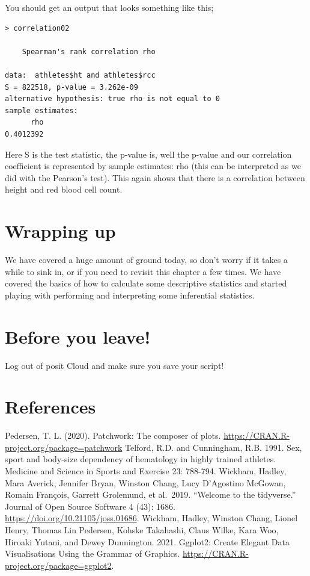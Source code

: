 \documentclass[
]{book}
\begin{document}
You should get an output that looks something like this;

\begin{verbatim}
> correlation02

    Spearman's rank correlation rho

data:  athletes$ht and athletes$rcc
S = 822518, p-value = 3.262e-09
alternative hypothesis: true rho is not equal to 0
sample estimates:
      rho 
0.4012392
\end{verbatim}

Here S is the test statistic, the p-value is, well the p-value and our correlation coefficient is represented by sample estimates: rho (this can be interpreted as we did with the Pearson's test). This again shows that there is a correlation between height and red blood cell count.

\section{Wrapping up}\label{wrapping-up-1}

We have covered a huge amount of ground today, so don't worry if it takes a while to sink in, or if you need to revisit this chapter a few times. We have covered the basics of how to calculate some descriptive statistics and started playing with performing and interpreting some inferential statistics.

\section{Before you leave!}\label{before-you-leave-8}

Log out of posit Cloud and make sure you save your script!

\section{References}\label{references-9}

Pedersen, T. L. (2020). Patchwork: The composer of plots. \url{https://CRAN.R-project.org/package=patchwork}
Telford, R.D. and Cunningham, R.B. 1991. Sex, sport and body-size dependency of hematology in highly trained athletes. Medicine and Science in Sports and Exercise 23: 788-794.
Wickham, Hadley, Mara Averick, Jennifer Bryan, Winston Chang, Lucy D'Agostino McGowan, Romain François, Garrett Grolemund, et al.~2019. ``Welcome to the tidyverse.'' Journal of Open Source Software 4 (43): 1686. \url{https://doi.org/10.21105/joss.01686}.
Wickham, Hadley, Winston Chang, Lionel Henry, Thomas Lin Pedersen, Kohske Takahashi, Claus Wilke, Kara Woo, Hiroaki Yutani, and Dewey Dunnington. 2021. Ggplot2: Create Elegant Data Visualisations Using the Grammar of Graphics. \url{https://CRAN.R-project.org/package=ggplot2}.
\end{document}
